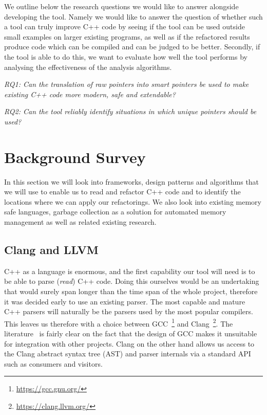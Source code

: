 \documentclass{proposal}
\begin{document}
    We outline below the research questions we would like to answer alongside developing the tool.
    Namely we would like to answer the question of whether such a tool can truly improve C++ code by seeing if the tool can be used outside small examples on larger existing programs, as well as if the refactored results produce code which can be compiled and can be judged to be better.
    Secondly, if the tool is able to do this, we want to evaluate how well the tool performs by analysing the effectiveness of the analysis algorithms.

    \emph{RQ1: Can the translation of raw pointers into smart pointers be used to make existing C++ code more modern, safe and extendable?}

    \emph{RQ2: Can the tool reliably identify situations in which unique pointers should be used?}




    \section{Background Survey}\label{sec:background-survey}

    In this section we will look into frameworks, design patterns and algorithms that we will use to enable us to read and refactor C++ code and to identify the locations where we can apply our refactorings.
    We also look into existing memory safe languages, garbage collection as a solution for automated memory management as well as related existing research.

    \subsection{Clang and LLVM}\label{subsec:clang-and-llvm}

    C++ as a language is enormous, and the first capability our tool will need is to be able to parse (\textit{read}) C++ code.
    Doing this ourselves would be an undertaking that would surely span longer than the time span of the whole project, therefore it was decided early to use an existing parser.
    The most capable and mature C++ parsers will naturally be the parsers used by the most popular compilers.
    This leaves us therefore with a choice between GCC~\footnote{\url{https://gcc.gnu.org/}} and Clang~\footnote{\url{https://clang.llvm.org/}}.
    The literature~\cite{Duffy2014} is fairly clear on the fact that the design of GCC makes it unsuitable for integration with other projects.
    Clang on the other hand allows us access to the Clang abstract syntax tree (AST) and parser internals via a standard API such as consumers and visitors.
\end{document}
